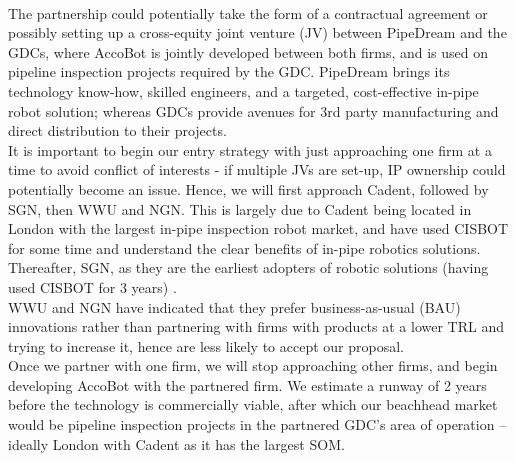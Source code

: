 \documentclass[11pt]{article}		%
\begin{document}
        \\ \hspace*{3ex}The partnership could potentially take the form of a contractual agreement or possibly setting up a cross-equity joint venture (JV) between PipeDream and the GDCs, where AccoBot is jointly developed between both firms, and is used on pipeline inspection projects required by the GDC. PipeDream brings its technology know-how, skilled engineers, and a targeted, cost-effective in-pipe robot solution; whereas GDCs provide avenues for 3rd party manufacturing and direct distribution to their projects. 
        \\ \hspace*{3ex}It is important to begin our entry strategy with just approaching one firm at a time to avoid conflict of interests - if multiple JVs are set-up, IP ownership could potentially become an issue. Hence, we will first approach Cadent, followed by SGN, then WWU and NGN. This is largely due to Cadent being located in London with the largest in-pipe inspection robot market, and have used CISBOT for some time and understand the clear benefits of in-pipe robotics solutions. Thereafter, SGN, as they are the earliest adopters of robotic solutions (having used CISBOT for 3 years) .
        \\ \hspace*{3ex}WWU and NGN have indicated that they prefer business-as-usual (BAU) innovations rather than partnering with firms with products at a lower TRL and trying to increase it, hence are less likely to accept our proposal. 
        \\ \hspace*{3ex}Once we partner with one firm, we will stop approaching other firms, and begin developing AccoBot with the partnered firm. We estimate a runway of 2 years  before the technology is commercially viable, after which our beachhead market would be pipeline inspection projects in the partnered GDC’s area of operation – ideally London with Cadent as it has the largest SOM. 
    
\end{document}
